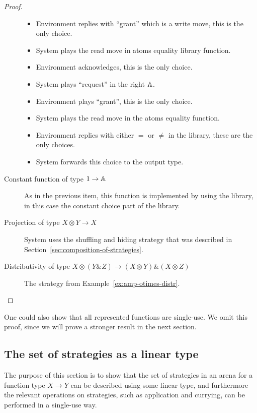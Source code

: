\begin{proof}
\begin{description}
\begin{itemize}
    \item Environment replies with ``grant'' which is a write move, this is the only choice.
    \item System plays the read move in atoms equality library function.
    \item Environment acknowledges, this is the only choice.
    \item System plays  ``request'' in the right $\mathbb A$.
    \item Environment plays ``grant'', this is the only choice.
    \item System plays the read move in the atoms equality function.
    \item Environment replies with either $=$ or $\neq$ in the library, these are the only choices.
    \item System forwards this choice to the output type.
\end{itemize}
        

        \item[Constant function of type $1 \to \mathbb A$] As in the previous item, this function is implemented by using the library, in this case the constant choice part of the library. 

        \item[Projection of type $ X \otimes Y \to X$] System uses the  shuffling and hiding strategy that was described in Section~\ref{sec:composition-of-strategies}. 

        \item[Distributivity  of type $X \otimes (Y \& Z) \to (X \otimes Y) \& (X \otimes Z)$] The  strategy from Example~\ref{ex:amp-otimes-distr}.  
    \end{description}
\end{proof}
One could also show that all represented functions are single-use. We omit this proof, since we will prove a stronger result in the next section. 

\subsection{The set of strategies as a linear type}
The purpose of this section is to show that the set of strategies in an arena for a function type $X \to Y$ can be described using some linear type, and furthermore the relevant operations on strategies, such as application and currying, can be performed in a single-use way.


